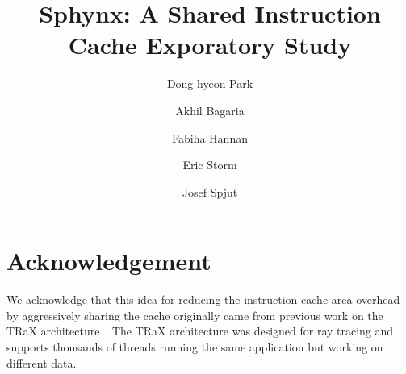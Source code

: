 \documentclass[pageno]{jpaper}
\begin{document}
\title{Sphynx: A Shared Instruction Cache Exporatory Study}

\author{Dong-hyeon Park \and Akhil Bagaria \and Fabiha Hannan \and
  Eric Storm \and Josef Spjut}

\date{}
\maketitle

\thispagestyle{empty}

\begin{abstract}

\end{abstract}







\section*{Acknowledgement}
We acknowledge that this idea for reducing the instruction cache area
overhead by aggressively sharing the cache originally came from
previous work on the TRaX
architecture~\cite{spjut08,spjut09,kopta10,spjut12,kopta13,kopta14}.
The TRaX architecture was designed for ray tracing and supports
thousands of threads running the same application but working on
different data.



\end{document}
